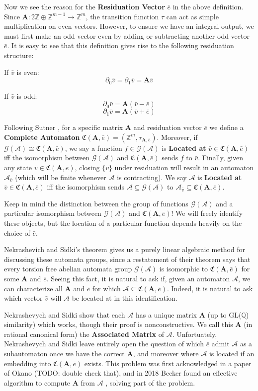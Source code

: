 \documentclass[runningheads]{llncs}
\newcommand{\A}{\mathcal{A}}
\newcommand{\G}{\mathcal{G}}
\newcommand{\C}{\mathfrak{C}(\Am,\e)}
\newcommand{\Z}{\mathbb{Z}}
\newcommand{\Q}{\mathbb{Q}}
\newcommand{\2}{\textbf{2}}
\newcommand{\Am}{\textbf{A}}
\newcommand{\del}{\partial}
\newcommand{\vv}{\bar{v}}
\newcommand{\e}{\bar{e}}
\begin{document}
Now we see the reason for the \textbf{Residuation Vector} $\e$ in the 
above definition. Since $\Am : 2\Z \oplus \Z^{m-1} \to \Z^m$, the transition
function $\tau$ can act as simple multiplication on even vectors. However,
to ensure we have an integral output, we must first make an odd vector 
even by adding or subtracting another odd vector $\e$. It is easy to see 
that this definition gives rise to the following residuation structure:

If $\vv$ is even:
\[ \del_0 \vv = \del_1 \vv = \Am \vv \]

If $\vv$ is odd:
\[ \del_0 \vv = \Am (\vv - \e) \]
\[ \del_1 \vv = \Am (\vv + \e) \]

\noindent
Following Sutner \cite{Sutner18:abelian_automata}, for a specific matrix
$\Am$ and residuation vector $\e$ we define a \textbf{Complete Automaton} 
$\C = (\Z^m, \tau_{\Am,\e})$. Moreover, if $\G(\A) \cong \C$, we say a 
function $f \in \G(\A)$ is \textbf{Located at} $\vv \in \C$ iff the isomorphism 
between $\G(\A)$ and $\C$ sends $f$ to $\vv$. Finally, given any 
state $\vv \in \C$, closing $\{ \vv \}$ under residuation will result in an
automaton $\A_{\vv}$ (which will be finite whenever $\A$ is contracting). 
We say $\A$ is \textbf{Located at} $\vv \in \C$ iff the isomorphism sends 
$\A \subseteq \G(\A)$ to $\A_{\vv} \subseteq \C$. 

Keep in mind the distinction between the group of functions $\G(\A)$
and a particular isomorphism between $\G(\A)$ and $\C$! We will freely
identify these objects, but the location of a particular function
depends heavily on the choice of $\e$.

Nekrashevich and Sidki's theorem gives us a purely linear algebraic method
for discussing these automata groups, since a restatement of their theorem 
says that every torsion free abelian automata group $\G(\A)$ is isomorphic 
to $\C$ for some $\Am$ and $\e$. Seeing this fact, it is natural to ask if,
given an automaton $\A$, we can characterize all $\Am$ and $\e$ for which 
$\A \subseteq \C$. Indeed, it is natural to ask which vector $\vv$ will $\A$
be located at in this identification.

Nekrashevych and Sidki show that each $\A$ 
has a unique matrix $\Am$ (up to GL($\Q$) similarity) which works, though
their proof is nonconstructive. We call this $\Am$ (in rational canonical form)
the \textbf{Associated Matrix} of $\A$. Unfortuately, Nekrashevych and Sidki 
leave entirely open the question of which $\e$ admit $\A$ as a subautomaton
once we have the correct $\Am$, and moreover where $\A$ is located
if an embedding into $\C$ exists. This problem was first acknowledged in a paper of 
Okano \cite{Okano15:thesis} (TODO: double check that), and in 2018 Becker found an 
effective algorithm to compute $\Am$ from $\A$ \cite{Becker18:thesis}, solving
part of the problem. 
\end{document}
